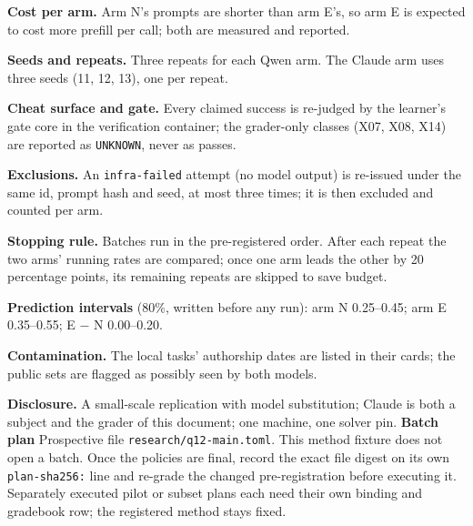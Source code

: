 \documentclass[11pt]{article}
\begin{document}
\begin{answer}
\textbf{Cost per arm.} Arm N's prompts are shorter than arm E's, so arm E is
expected to cost more prefill per call; both are measured and reported.

\textbf{Seeds and repeats.} Three repeats for each Qwen arm. The Claude arm uses
three seeds (11, 12, 13), one per repeat.

\textbf{Cheat surface and gate.} Every claimed success is re-judged by the
learner's gate core in the verification container; the grader-only classes
(X07, X08, X14) are reported as \texttt{UNKNOWN}, never as passes.

\textbf{Exclusions.} An \texttt{infra-failed} attempt (no model output) is
re-issued under the same id, prompt hash and seed, at most three times; it is
then excluded and counted per arm.

\textbf{Stopping rule.} Batches run in the pre-registered order. After each
repeat the two arms' running rates are compared; once one arm leads the other
by 20 percentage points, its remaining repeats are skipped to save budget.

\textbf{Prediction intervals} (80\%, written before any run): arm N 0.25--0.45;
arm E 0.35--0.55; E $-$ N 0.00--0.20.

\textbf{Contamination.} The local tasks' authorship dates are listed in their
cards; the public sets are flagged as possibly seen by both models.

\textbf{Disclosure.} A small-scale replication with model substitution; Claude
is both a subject and the grader of this document; one machine, one solver pin.
\textbf{Batch plan} Prospective file \texttt{research/q12-main.toml}.
This method fixture does not open a batch. Once the policies are final,
record the exact file digest on its own \texttt{plan-sha256:} line and
re-grade the changed pre-registration before executing it. Separately
executed pilot or subset plans each need their own binding and gradebook
row; the registered method stays fixed.
\end{answer}
\end{document}
